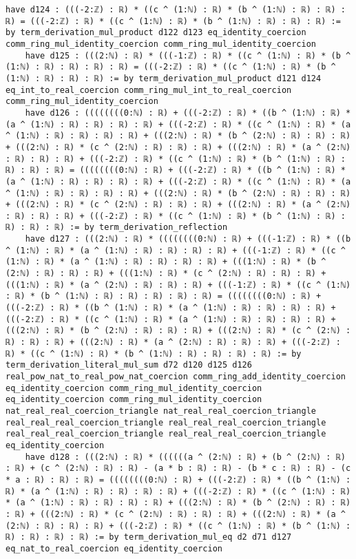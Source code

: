 \documentclass{article}
\begin{document}
\begin{tcolorbox}[colback=white!10, width=\linewidth]
\begin{lstlisting}[language=Lean4]
    have d124 : (((-2:ℤ) : ℝ) * ((c ^ (1:ℕ) : ℝ) * (b ^ (1:ℕ) : ℝ) : ℝ) : ℝ) = (((-2:ℤ) : ℝ) * ((c ^ (1:ℕ) : ℝ) * (b ^ (1:ℕ) : ℝ) : ℝ) : ℝ) := by term_derivation_mul_product d122 d123 eq_identity_coercion comm_ring_mul_identity_coercion comm_ring_mul_identity_coercion
    have d125 : (((2:ℕ) : ℝ) * (((-1:ℤ) : ℝ) * ((c ^ (1:ℕ) : ℝ) * (b ^ (1:ℕ) : ℝ) : ℝ) : ℝ) : ℝ) = (((-2:ℤ) : ℝ) * ((c ^ (1:ℕ) : ℝ) * (b ^ (1:ℕ) : ℝ) : ℝ) : ℝ) := by term_derivation_mul_product d121 d124 eq_int_to_real_coercion comm_ring_mul_int_to_real_coercion comm_ring_mul_identity_coercion
    have d126 : ((((((((0:ℕ) : ℝ) + (((-2:ℤ) : ℝ) * ((b ^ (1:ℕ) : ℝ) * (a ^ (1:ℕ) : ℝ) : ℝ) : ℝ) : ℝ) + (((-2:ℤ) : ℝ) * ((c ^ (1:ℕ) : ℝ) * (a ^ (1:ℕ) : ℝ) : ℝ) : ℝ) : ℝ) + (((2:ℕ) : ℝ) * (b ^ (2:ℕ) : ℝ) : ℝ) : ℝ) + (((2:ℕ) : ℝ) * (c ^ (2:ℕ) : ℝ) : ℝ) : ℝ) + (((2:ℕ) : ℝ) * (a ^ (2:ℕ) : ℝ) : ℝ) : ℝ) + (((-2:ℤ) : ℝ) * ((c ^ (1:ℕ) : ℝ) * (b ^ (1:ℕ) : ℝ) : ℝ) : ℝ) : ℝ) = ((((((((0:ℕ) : ℝ) + (((-2:ℤ) : ℝ) * ((b ^ (1:ℕ) : ℝ) * (a ^ (1:ℕ) : ℝ) : ℝ) : ℝ) : ℝ) + (((-2:ℤ) : ℝ) * ((c ^ (1:ℕ) : ℝ) * (a ^ (1:ℕ) : ℝ) : ℝ) : ℝ) : ℝ) + (((2:ℕ) : ℝ) * (b ^ (2:ℕ) : ℝ) : ℝ) : ℝ) + (((2:ℕ) : ℝ) * (c ^ (2:ℕ) : ℝ) : ℝ) : ℝ) + (((2:ℕ) : ℝ) * (a ^ (2:ℕ) : ℝ) : ℝ) : ℝ) + (((-2:ℤ) : ℝ) * ((c ^ (1:ℕ) : ℝ) * (b ^ (1:ℕ) : ℝ) : ℝ) : ℝ) : ℝ) := by term_derivation_reflection
    have d127 : (((2:ℕ) : ℝ) * ((((((((0:ℕ) : ℝ) + (((-1:ℤ) : ℝ) * ((b ^ (1:ℕ) : ℝ) * (a ^ (1:ℕ) : ℝ) : ℝ) : ℝ) : ℝ) + (((-1:ℤ) : ℝ) * ((c ^ (1:ℕ) : ℝ) * (a ^ (1:ℕ) : ℝ) : ℝ) : ℝ) : ℝ) + (((1:ℕ) : ℝ) * (b ^ (2:ℕ) : ℝ) : ℝ) : ℝ) + (((1:ℕ) : ℝ) * (c ^ (2:ℕ) : ℝ) : ℝ) : ℝ) + (((1:ℕ) : ℝ) * (a ^ (2:ℕ) : ℝ) : ℝ) : ℝ) + (((-1:ℤ) : ℝ) * ((c ^ (1:ℕ) : ℝ) * (b ^ (1:ℕ) : ℝ) : ℝ) : ℝ) : ℝ) : ℝ) = ((((((((0:ℕ) : ℝ) + (((-2:ℤ) : ℝ) * ((b ^ (1:ℕ) : ℝ) * (a ^ (1:ℕ) : ℝ) : ℝ) : ℝ) : ℝ) + (((-2:ℤ) : ℝ) * ((c ^ (1:ℕ) : ℝ) * (a ^ (1:ℕ) : ℝ) : ℝ) : ℝ) : ℝ) + (((2:ℕ) : ℝ) * (b ^ (2:ℕ) : ℝ) : ℝ) : ℝ) + (((2:ℕ) : ℝ) * (c ^ (2:ℕ) : ℝ) : ℝ) : ℝ) + (((2:ℕ) : ℝ) * (a ^ (2:ℕ) : ℝ) : ℝ) : ℝ) + (((-2:ℤ) : ℝ) * ((c ^ (1:ℕ) : ℝ) * (b ^ (1:ℕ) : ℝ) : ℝ) : ℝ) : ℝ) := by term_derivation_literal_mul_sum d72 d120 d125 d126 real_pow_nat_to_real_pow_nat_coercion comm_ring_add_identity_coercion eq_identity_coercion comm_ring_mul_identity_coercion eq_identity_coercion comm_ring_mul_identity_coercion nat_real_real_coercion_triangle nat_real_real_coercion_triangle real_real_real_coercion_triangle real_real_real_coercion_triangle real_real_real_coercion_triangle real_real_real_coercion_triangle eq_identity_coercion
    have d128 : (((2:ℕ) : ℝ) * ((((((a ^ (2:ℕ) : ℝ) + (b ^ (2:ℕ) : ℝ) : ℝ) + (c ^ (2:ℕ) : ℝ) : ℝ) - (a * b : ℝ) : ℝ) - (b * c : ℝ) : ℝ) - (c * a : ℝ) : ℝ) : ℝ) = ((((((((0:ℕ) : ℝ) + (((-2:ℤ) : ℝ) * ((b ^ (1:ℕ) : ℝ) * (a ^ (1:ℕ) : ℝ) : ℝ) : ℝ) : ℝ) + (((-2:ℤ) : ℝ) * ((c ^ (1:ℕ) : ℝ) * (a ^ (1:ℕ) : ℝ) : ℝ) : ℝ) : ℝ) + (((2:ℕ) : ℝ) * (b ^ (2:ℕ) : ℝ) : ℝ) : ℝ) + (((2:ℕ) : ℝ) * (c ^ (2:ℕ) : ℝ) : ℝ) : ℝ) + (((2:ℕ) : ℝ) * (a ^ (2:ℕ) : ℝ) : ℝ) : ℝ) + (((-2:ℤ) : ℝ) * ((c ^ (1:ℕ) : ℝ) * (b ^ (1:ℕ) : ℝ) : ℝ) : ℝ) : ℝ) := by term_derivation_mul_eq d2 d71 d127 eq_nat_to_real_coercion eq_identity_coercion

\end{lstlisting}
\end{tcolorbox}
\end{document}

